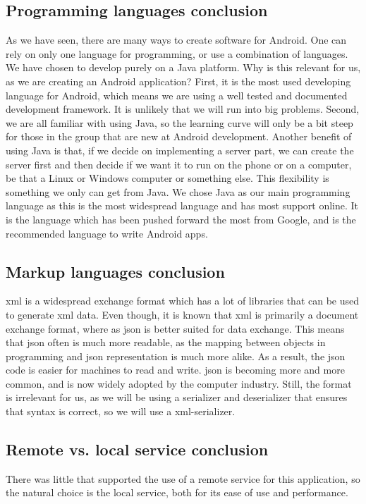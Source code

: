 \subsection{Programming languages conclusion}
As we have seen, there are many ways to create software for Android. One can rely on only one language for programming, or use a combination of languages. We have chosen to develop purely on a Java platform. Why is this relevant for us, as we are creating an Android application?
\newline
\newline
First, it is the most used developing language for Android, which means we are using a well tested and documented development framework. It is unlikely that we will run into big problems. Second, we are all familiar with using Java, so the learning curve will only be a bit steep for those in the group that are new at Android development.  Another benefit of using Java is that, if we decide on implementing a server part, we can create the server first and then decide if we want it to run on the phone or on a computer, be that a Linux or Windows computer or something else. This flexibility is something we only can get from Java.
\newline
\newline
We chose Java as our main programming language as this is the most widespread language and has most support online. It is the language which has been pushed forward the most from Google, and is the recommended language to write Android apps.

\subsection{Markup languages conclusion}
\gls{xml} is a widespread exchange format which has a lot of libraries that can be used to generate \gls{xml} data. Even though, it is known that \gls{xml} is primarily a document exchange format, where as \gls{json} is better suited for data exchange. This means that \gls{json} often is much more readable, as the mapping between objects in programming and \gls{json} representation is much more alike. As a result, the \gls{json} code is easier for machines to read and write. \gls{json} is becoming more and more common, and is now widely adopted by the computer industry. Still, the format is irrelevant for us, as we will be using a serializer and deserializer that ensures that syntax is correct, so we will use a \gls{xml}-serializer. 

\subsection{Remote vs. local service conclusion}
There was little that supported the use of a remote service for this application, so the natural choice is the local service, both for its ease of use and performance.

